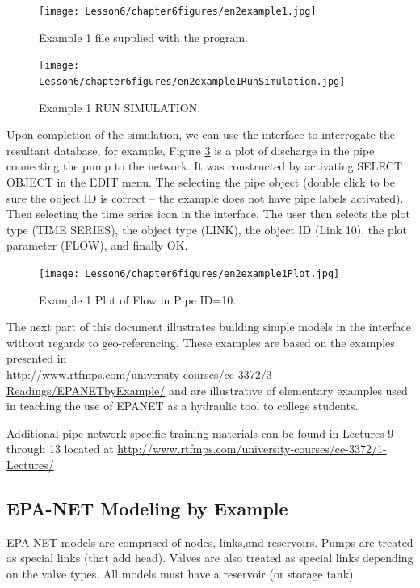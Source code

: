 \clearpage
\begin{figure}[h!] %
   \centering
   \texttt{[image: Lesson6/chapter6figures/en2example1.jpg]} 
   \caption{Example 1 file supplied with the program.}
   \label{fig:en2example1}
\end{figure}


\begin{figure}[h!] %
   \centering
   \texttt{[image: Lesson6/chapter6figures/en2example1RunSimulation.jpg]} 
   \caption{Example 1 RUN SIMULATION.}
   \label{fig:en2example1RunSimulation}
\end{figure}
Upon completion of the simulation, we can use the interface to interrogate the resultant database, for example, Figure \ref{fig:en2example1Plot} is a plot of discharge in the pipe connecting the pump to the network.
It was constructed by activating SELECT OBJECT in the EDIT menu.
The selecting the pipe object (double click to be sure the object ID is correct -- the example does not have pipe labels activated).   
Then selecting the time series icon in the interface.
The user then selects the plot type (TIME SERIES), the object type (LINK), the object ID (Link 10), the plot parameter (FLOW), and finally OK.
\begin{figure}[h!] %
   \centering
   \texttt{[image: Lesson6/chapter6figures/en2example1Plot.jpg]} 
   \caption{Example 1 Plot of Flow in Pipe ID=10.}
   \label{fig:en2example1Plot}
\end{figure}

The next part of this document illustrates building simple models in the interface without regards to geo-referencing.
These examples are based on the examples presented in \\ \url{http://www.rtfmps.com/university-courses/ce-3372/3-Readings/EPANETbyExample/} and are illustrative of elementary examples used in teaching the use of EPANET as a hydraulic tool to college students.

Additional pipe network specific training materials can be found in Lectures 9 through 13 located at
\url{http://www.rtfmps.com/university-courses/ce-3372/1-Lectures/}

\clearpage


\subsection{EPA-NET Modeling by Example}
EPA-NET models are comprised of nodes, links,and reservoirs.    
Pumps are treated as special links (that add head).  
Valves are also treated as special links depending on the valve types.  
All models must have a reservoir (or storage tank).

